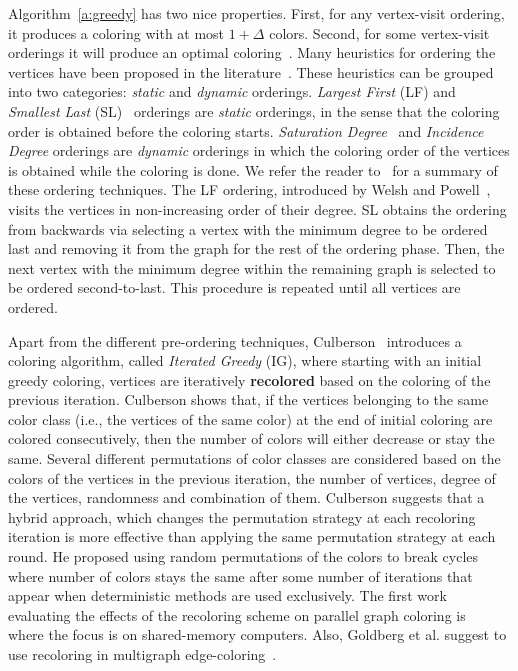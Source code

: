 \documentclass{article}
\newcommand{\maxdegree}{\ensuremath{\Delta}}
\begin{document}
Algorithm~\ref{a:greedy} has two nice properties. First, for any
vertex-visit ordering, it produces a coloring with at most
$1+\maxdegree$ colors. Second, for some vertex-visit orderings it will
produce an optimal coloring~\cite{GMP05}. Many heuristics for ordering
the vertices have been proposed in the literature~\cite{GMP05}. These
heuristics can be grouped into two categories: {\em static} and {\em
  dynamic} orderings.  {\em Largest First} (LF) and {\em Smallest
  Last} (SL)~\cite{Matula1983} orderings are {\em static} orderings,
in the sense that the coloring order is obtained before the coloring
starts. {\em Saturation Degree}~\cite{Brelaz1979} and {\em Incidence
  Degree} orderings are {\em dynamic} orderings in which the coloring
order of the vertices is obtained while the coloring is done. We refer
the reader to~\cite{GMP05} for a summary of these ordering
techniques. The LF ordering, introduced by Welsh and
Powell~\cite{Welsh01011967}, visits the vertices in non-increasing
order of their degree. SL obtains the ordering from backwards via selecting a
vertex with the minimum degree to be ordered last and removing it from
the graph for the rest of the ordering phase. Then, the next vertex
with the minimum degree within the remaining graph is selected to be
ordered second-to-last. This procedure is repeated until all vertices
are ordered. 

Apart from the different pre-ordering techniques,
Culberson~\cite{Culberson92iteratedgreedy} introduces a coloring
algorithm, called {\em Iterated Greedy} (IG), where starting with an initial
greedy coloring, vertices are iteratively \textbf{recolored} based on the
coloring of the previous iteration. Culberson shows that, if the
vertices belonging to the same color class (i.e.,
the vertices of the same color) at the end of initial coloring are colored
consecutively, then the number of colors will either decrease or stay the
same. Several different permutations of color classes are considered
based on the colors of the vertices in the previous iteration, the
number of vertices, degree of the vertices, randomness
and combination of them. Culberson suggests that a hybrid approach, which
changes the permutation strategy at each recoloring iteration is more
effective than applying the same permutation strategy at each round. He proposed using 
random permutations of the colors to break cycles where number of colors stays the same after
some number of iterations that appear when deterministic methods are used exclusively.
The first work evaluating the effects of the recoloring scheme on parallel 
graph coloring is~\cite{Gebremedhin_parallelgraph} where the focus is
on shared-memory computers. Also, Goldberg et al. suggest to use recoloring
in multigraph edge-coloring~\cite{JGT:JGT3190080115}.
\end{document}
